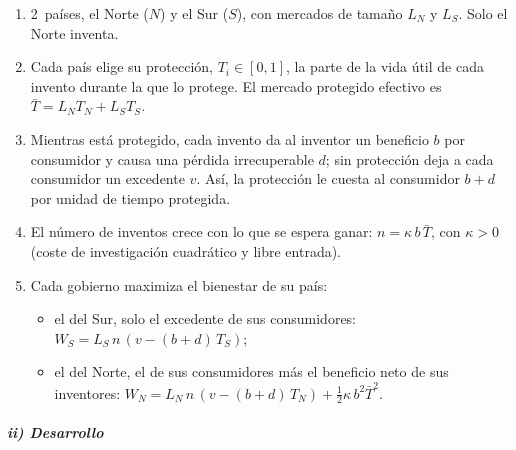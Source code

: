 \documentclass[11pt]{article}
\begin{document}
\begin{enumerate}
\item 2~países, el Norte ($N$) y el Sur ($S$), con mercados de tamaño $L_N$ y $L_S$. Solo el Norte inventa.
\item Cada país elige su protección, $T_i\in[0,1]$, la parte de la vida útil de cada invento durante la que lo protege. El mercado protegido efectivo es $\bar T=L_NT_N+L_ST_S$.
\item Mientras está protegido, cada invento da al inventor un beneficio $b$ por consumidor y causa una pérdida irrecuperable $d$; sin protección deja a cada consumidor un excedente $v$. Así, la protección le cuesta al consumidor $b+d$ por unidad de tiempo protegida.
\item El número de inventos crece con lo que se espera ganar: $n=\kappa\,b\,\bar T$, con $\kappa>0$ (coste de investigación cuadrático y libre entrada).
\item Cada gobierno maximiza el bienestar de su país:
  \begin{itemize}
  \item el del Sur, solo el excedente de sus consumidores: $W_S=L_S\,n\,(v-(b+d)\,T_S)$;
  \item el del Norte, el de sus consumidores más el beneficio neto de sus inventores: $W_N=L_N\,n\,(v-(b+d)\,T_N)+\tfrac12\kappa\,b^2\bar T^2$.
  \end{itemize}
\end{enumerate}

\subparagraph{ii) Desarrollo}
\end{document}
